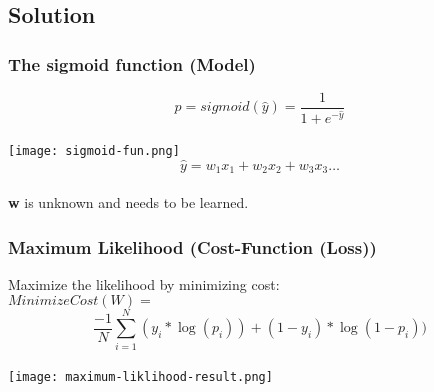\subsection{Solution}
\subsubsection{The sigmoid function (Model)}
$$p = sigmoid(\hat{y}) = \frac{1}{1 + e^{-\hat{y}}}$$\\
\texttt{[image: sigmoid-fun.png]}
$$\hat{y} = w_1x_1 + w_2x_2 + w_3x_3\dots$$\\
\textbf{w} is unknown and needs to be learned.

\subsubsection{Maximum Likelihood (Cost-Function (Loss))}
Maximize the likelihood by minimizing cost:\\
$Minimize Cost(W) =$\\
$$\frac{-1}{N}\displaystyle\sum_{i = 1}^{N}(y_i * \log(p_i)) + (1-y_i)*\log(1-p_i)) $$\\
\texttt{[image: maximum-liklihood-result.png]}